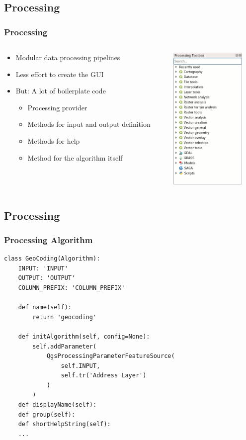 \subsection{Processing}
\begin{frame}
\frametitle{Processing}
	\begin{columns}[T] %
		\begin{column}[T]{7cm} %
			\begin{itemize}
				\item Modular data processing pipelines
				\item Less effort to create the GUI
				\item But: A lot of boilerplate code
				\begin{itemize}
					\item Processing provider
					\item Methods for input and output definition
					\item Methods for help
					\item Method for the algorithm itself
				\end{itemize}
			\end{itemize}
		\end{column}
		\begin{column}[T]{3cm} %
			\includegraphics[height=7cm]{img/processing-toolbox.png}
		\end{column}
	\end{columns}
\end{frame}

\subsection{Processing}
\begin{frame}[fragile]
\frametitle{Processing Algorithm}
\begin{lstlisting}[style=pythoncode]
class GeoCoding(Algorithm):
	INPUT: 'INPUT'
	OUTPUT: 'OUTPUT'
	COLUMN_PREFIX: 'COLUMN_PREFIX'
	
	def name(self):
		return 'geocoding'
		
	def initAlgorithm(self, config=None):
		self.addParameter(
            QgsProcessingParameterFeatureSource(
                self.INPUT,
                self.tr('Address Layer')
            )
        )
	def displayName(self):
	def group(self):
	def shortHelpString(self):
	...
\end{lstlisting}
\end{frame}

